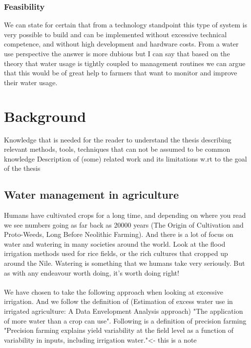 \documentclass[]{uiophd}
\begin{document}
\subsection{Feasibility}
We can state for certain that from a technology standpoint this type of system is very possible to build and can be implemented without excessive technical competence, and without high development and hardware costs. From a water use perspective the answer is more dubious but I can say that based on the theory that water usage is tightly coupled to management routines we can argue that this would be of great help to farmers that want to monitor and improve their water usage.


\chapter{Background}

Knowledge that is needed for the reader to understand the thesis describing relevant methods, tools, techniques that can not be assumed to be common knowledge
Description of (some) related work and its limitations w.rt to the goal of the thesis

\section{Water management in agriculture}
Humans have cultivated crops for a long time, and depending on where you read we see numbers going as far back as 20000 years (The Origin of Cultivation and Proto-Weeds, Long Before Neolithic Farming). And there is a lot of focus on water and watering in many societies around the world. Look at the flood irrigation methods used for rice fields, or the rich cultures that cropped up around the Nile. Watering is something that we humans take very seriously. But as with any endeavour worth doing, it's worth doing right! 
\\\\
We have chosen to take the following approach when looking at excessive irrigation. And we follow the definition of (Estimation of excess water use in irrigated agriculture: A Data Envelopment Analysis approach) "The application of more water than a crop can use". Following is a definition of precision farming "Precision farming explains yield variability at the field level as a function of variability in inputs, including irrigation water."<- this is a note
\\\\
\end{document}
